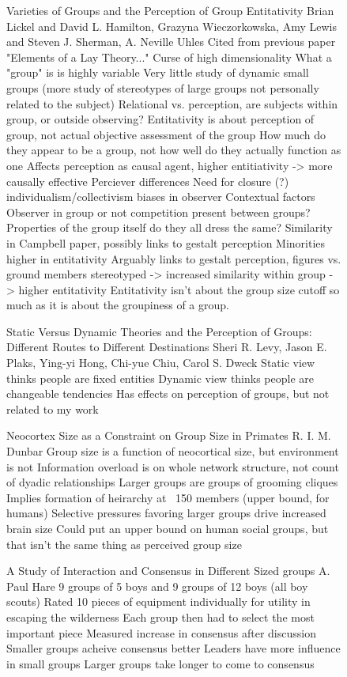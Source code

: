 \begin{subfigure}{0.48\textwidth}
Varieties of Groups and the Perception of Group Entitativity
Brian Lickel and David L. Hamilton, Grazyna Wieczorkowska, Amy Lewis and Steven J. Sherman, A. Neville Uhles
	Cited from previous paper "Elements of a Lay Theory..."
	Curse of high dimensionality
		What a "group" is is highly variable
	Very little study of dynamic small groups (more study of stereotypes of large groups not personally related to the subject)
		Relational vs. perception, are subjects within group, or outside observing?
	Entitativity is about perception of group, not actual objective assessment of the group
		How much do they appear to be a group, not how well do they actually function as one
		Affects perception as causal agent, higher entitiativity -> more causally effective
	Perciever differences
		Need for closure (?)
		individualism/collectivism biases in observer
	Contextual factors
		Observer in group or not
		competition present between groups?
	Properties of the group itself
		do they all dress the same?
		Similarity in Campbell paper, possibly links to gestalt perception
	Minorities higher in entitativity
		Arguably links to gestalt perception, figures vs. ground
		members stereotyped -> increased similarity within group -> higher entitativity
	Entitativity isn't about the group size cutoff so much as it is about the groupiness of a group. 

Static Versus Dynamic Theories and the Perception of Groups: Different Routes to Different Destinations
Sheri R. Levy, Jason E. Plaks, Ying-yi Hong, Chi-yue Chiu, Carol S. Dweck
	Static view thinks people are fixed entities
	Dynamic view thinks people are changeable tendencies
	Has effects on perception of groups, but not related to my work

Neocortex Size as a Constraint on Group Size in Primates
R. I. M. Dunbar
	Group size is a function of neocortical size, but environment is not 
	Information overload is on whole network structure, not count of dyadic relationships
	Larger groups are groups of grooming cliques
		Implies formation of heirarchy at ~150 members (upper bound, for humans)
	Selective pressures favoring larger groups drive increased brain size
	Could put an upper bound on human social groups, but that isn't the same thing as perceived group size

A Study of Interaction and Consensus in Different Sized groups
A. Paul Hare
	9 groups of 5 boys and 9 groups of 12 boys (all boy scouts)
	Rated 10 pieces of equipment individually for utility in escaping the wilderness
		Each group then had to select the most important piece
	Measured increase in consensus after discussion
	Smaller groups acheive consensus better
	Leaders have more influence in small groups
	Larger groups take longer to come to consensus



\end{subfigure}
